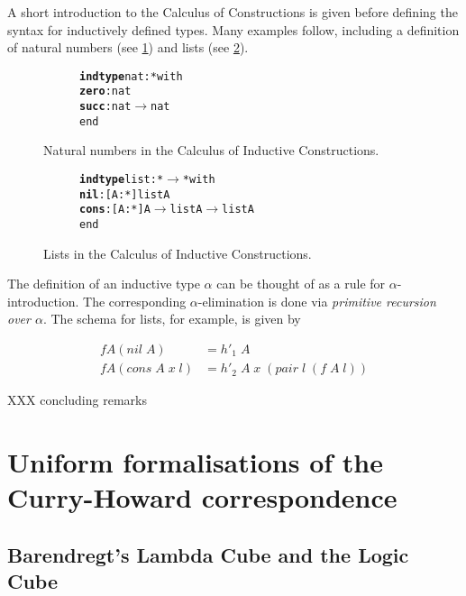 \documentclass[12pt,toc=bibliography,numbers=noendperiod,
               footnotes=multiple,twoside]{scrartcl}
\begin{document}
A short introduction to the Calculus of Constructions is given before defining the syntax for inductively defined types. Many examples follow, including a definition of natural numbers (see \cref{fig:nat-inductive-type}) and lists (see \cref{fig:list-inductive-type}).

\begin{figure}[h]
\centering
\begin{subfigure}[t]{0.3\linewidth}
\begin{alltt}
\textbf{indtype} nat : * with
    \textbf{zero} : nat
    \textbf{succ} : nat \(\rightarrow\) nat
end
\end{alltt}
\end{subfigure}
\caption{Natural numbers in the Calculus of Inductive Constructions.}
\label{fig:nat-inductive-type}
\end{figure}

\begin{figure}[h]
\centering
\begin{subfigure}[t]{0.4\linewidth}
\begin{alltt}
\textbf{indtype} list : * \(\rightarrow\) * with
    \textbf{nil}  : [A : *] list A
    \textbf{cons} : [A : *] A \(\rightarrow\) list A \(\rightarrow\) list A
end
\end{alltt}
\end{subfigure}
\caption{Lists in the Calculus of Inductive Constructions.}
\label{fig:list-inductive-type}
\end{figure}

The definition of an inductive type \(\alpha\) can be thought of as a rule for \(\alpha\)-introduction. The corresponding \(\alpha\)-elimination is done via \emph{primitive recursion over \(\alpha\)}. The schema for lists, for example, is given by

\begin{align*}
f A (\textit{nil}\;A) &= h'_1\;A \\
f A (\textit{cons}\;A\;x\;l) &= h'_2\;A\;x\;(\textit{pair}\;l\;(f\;A\;l))
\end{align*}

XXX concluding remarks


\section{Uniform formalisations of the Curry-Howard correspondence}

\subsection{\label{ssc:cubes}Barendregt's Lambda Cube and the Logic Cube}
\end{document}
